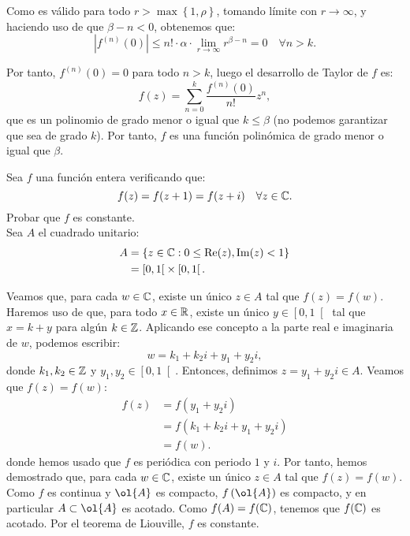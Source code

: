 \begin{ejercicio}
    Como es válido para todo $r> \max \left\{1,\rho \right\}$, tomando límite con $r\to \infty$, y haciendo uso de que $\beta-n<0$, obtenemos que:
    \begin{equation*}
        |f^{(n)}(0)| \leq n!\cdot \alpha \cdot \lim_{r\to \infty} r^{\beta-n}=0 \quad \forall n>k.
    \end{equation*}

    Por tanto, $f^{(n)}(0)=0$ para todo $n>k$, luego el desarrollo de Taylor de $f$ es:
    \begin{equation*}
        f(z)=\sum_{n=0}^{k} \dfrac{f^{(n)}(0)}{n!} z^n,
    \end{equation*}
    que es un polinomio de grado menor o igual que $k\leq \beta$ (no podemos garantizar que sea de grado $k$). Por tanto, $f$ es una función polinómica de grado menor o igual que $\beta$.
\end{ejercicio}

\begin{ejercicio}
    Sea $f$ una función entera verificando que:
    \begin{equation*}
        f(z)=f(z+1)=f(z+i) \quad \forall z\in \mathbb{C}.
    \end{equation*}
    Probar que $f$ es constante.\\

    Sea $A$ el cuadrado unitario:
    \begin{align*}
        A &= \left\{ z\in \mathbb{C} : 0\leq \operatorname{Re}(z),\operatorname{Im}(z)<1 \right\} \\
        &= \left[0,1\right[ \times \left[0,1\right[.
    \end{align*}

    Veamos que, para cada $w\in \mathbb{C}$, existe un único $z\in A$ tal que $f(z)=f(w)$. Haremos uso de que, para todo $x\in \mathbb{R}$, existe un único $y\in \left[0,1\right[$ tal que $x=k+y$ para algún $k\in \mathbb{Z}$. Aplicando ese concepto a la parte real e imaginaria de $w$, podemos escribir:
    \begin{equation*}
        w=k_1 + k_2 i + y_1 + y_2 i,
    \end{equation*}
    donde $k_1,k_2\in \mathbb{Z}$ y $y_1,y_2\in \left[0,1\right[$. Entonces, definimos $z=y_1 + y_2 i\in A$. Veamos que $f(z)=f(w)$:
    \begin{align*}
        f(z) &= f(y_1 + y_2 i) \\
        &= f(k_1 + k_2 i + y_1 + y_2 i) \\
        &= f(w).
    \end{align*}
    donde hemos usado que $f$ es periódica con periodo $1$ y $i$. Por tanto, hemos demostrado que, para cada $w\in \mathbb{C}$, existe un único $z\in A$ tal que $f(z)=f(w)$.\\

    Como $f$ es continua y $\ol{A}$ es compacto, $f\left(\ol{A}\right)$ es compacto, y en particular $A\subset \ol{A}$ es acotado. Como $f(A)=f(\mathbb{C})$, tenemos que $f(\mathbb{C})$ es acotado. Por el teorema de Liouville, $f$ es constante.
\end{ejercicio}


